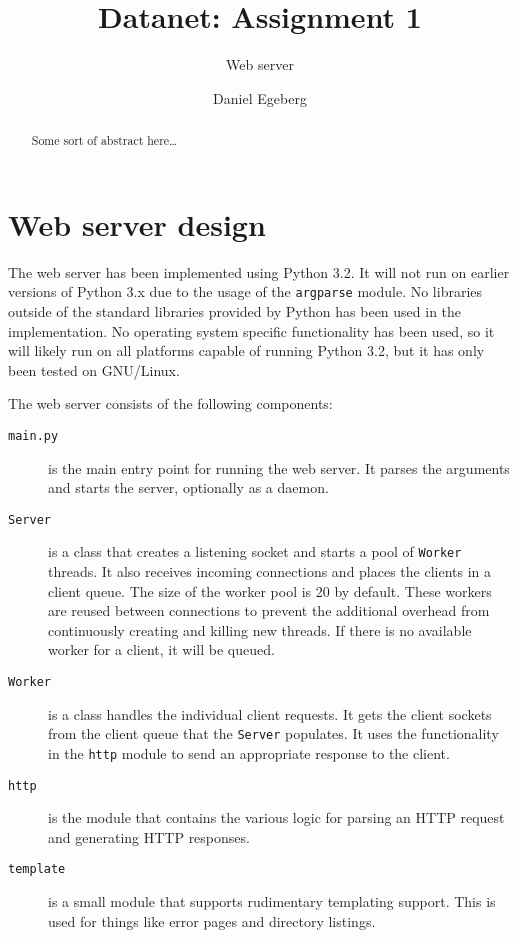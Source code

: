 \documentclass{sig-alternate}
\begin{document}
\title{Datanet: Assignment 1}
\subtitle{Web server}


\author{
\alignauthor
    Daniel Egeberg\\
}

\maketitle

\begin{abstract}
    Some sort of abstract here\ldots
\end{abstract}

\section{Web server design}

The web server has been implemented using Python 3.2. It will not run on
earlier versions of Python 3.x due to the usage of the \verb+argparse+
module. No libraries outside of the standard libraries provided by Python has
been used in the implementation. No operating system specific functionality
has been used, so it will likely run on all platforms capable of running
Python 3.2, but it has only been tested on GNU/Linux.

The web server consists of the following components:

\begin{description}
    \item[\texttt{main.py}] is the main entry point for running the web
        server. It parses the arguments and starts the server, optionally as a
        daemon.
    \item[\texttt{Server}] is a class that creates a listening socket
        and starts a pool of \texttt{Worker} threads. It also receives
        incoming connections and places the clients in a client queue. The
        size of the worker pool is 20 by default. These workers are reused
        between connections to prevent the additional overhead from
        continuously creating and killing new threads. If there is no
        available worker for a client, it will be queued.
    \item[\texttt{Worker}] is a class handles the individual client requests.
        It gets the client sockets from the client queue that the
        \texttt{Server} populates. It uses the functionality in the
        \texttt{http} module to send an appropriate response to the client.
    \item[\texttt{http}] is the module that contains the various logic for
        parsing an HTTP request and generating HTTP responses.
    \item[\texttt{template}] is a small module that supports rudimentary
        templating support. This is used for things like error pages and
        directory listings.
\end{description}
\end{document}
